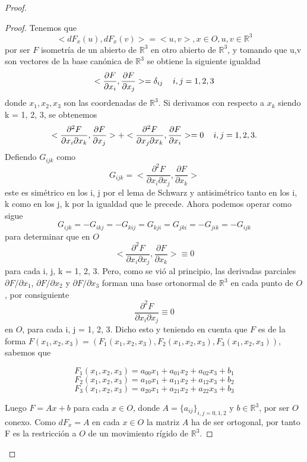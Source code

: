 \begin{proof}
	\begin{proof}
		Tenemos que
		\[
		<dF_x(u), dF_x(v)> = <u, v>, x \in O, u,v \in \mathbb{R}^3
		\]
		por ser $F$ isometría de un abierto de $\mathbb{R}^3$ en otro abierto de $\mathbb{R}^3$, y tomando que u,v son vectores de la base canónica de $\mathbb{R}^3$ se obtiene la siguiente igualdad
		\[
		<\frac{\partial F}{\partial x_i}, \frac{\partial F}{\partial x_j}> = \delta_{ij} \thinspace \thinspace \thinspace \thinspace \thinspace \thinspace \thinspace i,j = 1,2,3
		\]
		donde $x_1, x_2, x_3$ son las coordenadas de $\mathbb{R}^3$. Si derivamos con respecto a $x_k$ siendo k = 1, 2, 3, se obtenemos
		\[
		<\frac{\partial^2 F}{\partial x_i \partial x_k}, \frac{\partial F}{\partial x_j}> + <\frac{\partial^2 F}{\partial x_j \partial x_k}, \frac{\partial F}{\partial x_i}> = 0 \thinspace \thinspace \thinspace \thinspace \thinspace \thinspace \thinspace i,j = 1,2,3.
		\]
		Defiendo $G_{ijk}$ como
		\[
		G_{ijk} = <\frac{\partial^2 F}{\partial x_i \partial x_j}, \frac{\partial F}{\partial x_k}>
		\]
		este es simétrico en los i, j por el lema de Schwarz y antisimétrico tanto en los i, k como en los j, k por la igualdad que le precede. Ahora podemos operar como sigue
		\[
		G_{ijk} = -G_{ikj} = -G_{kij} = G_{kji} = G_{jki} = -G_{jik} = -G_{ijk}
		\]
		para determinar que en $O$
		\[
		<\frac{\partial^2 F}{\partial x_i \partial x_j}, \frac{\partial F}{\partial x_k}> \equiv 0
		\]
		para cada i, j, k = 1, 2, 3. Pero, como se vió al principio, las derivadas parciales $\partial F / \partial x_1$, $\partial F / \partial x_2$ y $\partial F / \partial x_3$ forman una base ortonormal de $\mathbb{R}^3$ en cada punto de $O$, por consiguiente
		\[
		\frac{\partial^2 F}{\partial x_i \partial x_j} \equiv 0
		\] en $O$, para cada  i, j = 1, 2, 3. Dicho esto y teniendo en cuenta  que $F$ es de la forma $F(x_1, x_2, x_3) = (F_1(x_1, x_2, x_3), F_2(x_1, x_2, x_3), F_3(x_1, x_2, x_3))$, sabemos que
		
		\[
		F_1(x_1, x_2, x_3) = a_{00}x_1 + a_{01}x_2 + a_{02}x_3 + b_1
		\]
		\[
		F_2(x_1, x_2, x_3) = a_{10}x_1 + a_{11}x_2 + a_{12}x_3 + b_2
		\]
		\[
		F_3(x_1, x_2, x_3) = a_{20}x_1 + a_{21}x_2 + a_{22}x_3 + b_3
		\]
		
		${ }$\\	
		
		Luego $F = Ax + b$ para cada $x \in O$, donde $A = \{a_{ij}\}_{i,j=0,1,2}$ y $b \in \mathbb{R}^3$, por ser $O$ conexo. Como $dF_x=A$ en cada $x \in O$ la matriz $A$ ha de ser ortogonal, por tanto F es la restricción a $O$ de un movimiento rígido de $\mathbb{R}^3$.
		
	\end{proof}
	
\end{proof}




